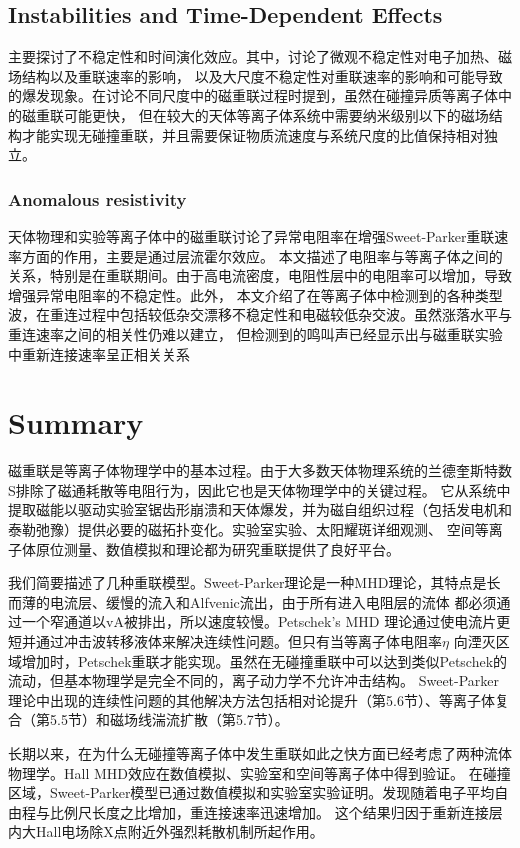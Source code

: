 \documentclass[12pt, a4paper, oneside]{article}
\begin{document}
\begin{spacing}{2.0}
\subsection{Instabilities and Time-Dependent Effects}
主要探讨了不稳定性和时间演化效应。其中，讨论了微观不稳定性对电子加热、磁场结构以及重联速率的影响，
以及大尺度不稳定性对重联速率的影响和可能导致的爆发现象。在讨论不同尺度中的磁重联过程时提到，虽然在碰撞异质等离子体中的磁重联可能更快，
但在较大的天体等离子体系统中需要纳米级别以下的磁场结构才能实现无碰撞重联，并且需要保证物质流速度与系统尺度的比值保持相对独立。

\subsubsection{Anomalous resistivity}
天体物理和实验等离子体中的磁重联讨论了异常电阻率在增强Sweet-Parker重联速率方面的作用，主要是通过层流霍尔效应。
本文描述了电阻率与等离子体之间的关系，特别是在重联期间。由于高电流密度，电阻性层中的电阻率可以增加，导致增强异常电阻率的不稳定性。此外，
本文介绍了在等离子体中检测到的各种类型波，在重连过程中包括较低杂交漂移不稳定性和电磁较低杂交波。虽然涨落水平与重连速率之间的相关性仍难以建立，
但检测到的鸣叫声已经显示出与磁重联实验中重新连接速率呈正相关关系


\section{Summary}
磁重联是等离子体物理学中的基本过程。由于大多数天体物理系统的兰德奎斯特数S排除了磁通耗散等电阻行为，因此它也是天体物理学中的关键过程。
它从系统中提取磁能以驱动实验室锯齿形崩溃和天体爆发，并为磁自组织过程（包括发电机和泰勒弛豫）提供必要的磁拓扑变化。实验室实验、太阳耀斑详细观测、
空间等离子体原位测量、数值模拟和理论都为研究重联提供了良好平台。

我们简要描述了几种重联模型。Sweet-Parker理论是一种MHD理论，其特点是长而薄的电流层、缓慢的流入和Alfvenic流出，由于所有进入电阻层的流体
都必须通过一个窄通道以vA被排出，所以速度较慢。Petschek's MHD 理论通过使电流片更短并通过冲击波转移液体来解决连续性问题。但只有当等离子体电阻率$\eta$
向湮灭区域增加时，Petschek重联才能实现。虽然在无碰撞重联中可以达到类似Petschek的流动，但基本物理学是完全不同的，离子动力学不允许冲击结构。
Sweet-Parker理论中出现的连续性问题的其他解决方法包括相对论提升（第5.6节）、等离子体复合（第5.5节）和磁场线湍流扩散（第5.7节）。

长期以来，在为什么无碰撞等离子体中发生重联如此之快方面已经考虑了两种流体物理学。Hall MHD效应在数值模拟、实验室和空间等离子体中得到验证。
在碰撞区域，Sweet-Parker模型已通过数值模拟和实验室实验证明。发现随着电子平均自由程与比例尺长度之比增加，重连接速率迅速增加。
这个结果归因于重新连接层内大Hall电场除X点附近外强烈耗散机制所起作用。


\end{spacing}
\end{document}
